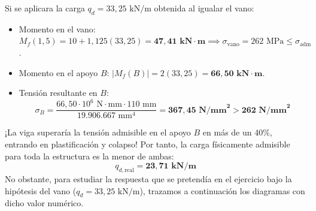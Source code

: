 \begin{tcolorbox}[colback=red!10!white,colframe=red!80!black,title=\textbf{Discusión Crítica de Ingeniería: ¿Por qué $q_d = 33{,}25\text{ kN/m}$ no es admisible?}]
    Si se aplicara la carga $q_d = 33{,}25\text{ kN/m}$ obtenida al igualar el vano:
    \begin{itemize}
        \item Momento en el vano: $M_f(1{,}5) = 10 + 1{,}125(33{,}25) = \mathbf{47{,}41\text{ kN}\cdot\text{m}} \implies \sigma_{\text{vano}} = 262\text{ MPa} \le \sigma_{\text{adm}}$.
        \item Momento en el apoyo $B$: $|M_f(B)| = 2(33{,}25) = \mathbf{66{,}50\text{ kN}\cdot\text{m}}$.
        \item Tensión resultante en $B$:
              \[
                  \sigma_B = \frac{66{,}50 \cdot 10^6\text{ N}\cdot\text{mm} \cdot 110\text{ mm}}{19.906.667\text{ mm}^4} = \mathbf{367{,}45\text{ N/mm}^2 > 262\text{ N/mm}^2}
              \]
    \end{itemize}
    ¡La viga superaría la tensión admisible en el apoyo $B$ en más de un 40\%, entrando en plastificación y colapso! Por tanto, la carga físicamente admisible para toda la estructura es la menor de ambas:
    \begin{equation}
        \boxed{q_{d,\text{real}} = \mathbf{23{,}71\text{ kN/m}}}
    \end{equation}
    No obstante, para estudiar la respuesta que se pretendía en el ejercicio bajo la hipótesis del vano ($q_d = 33{,}25\text{ kN/m}$), trazamos a continuación los diagramas con dicho valor numérico.
\end{tcolorbox}


